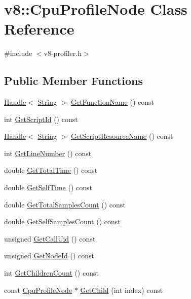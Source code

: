 \hypertarget{classv8_1_1_cpu_profile_node}{}\section{v8\+:\+:Cpu\+Profile\+Node Class Reference}
\label{classv8_1_1_cpu_profile_node}


{\ttfamily \#include $<$v8-\/profiler.\+h$>$}

\subsection*{Public Member Functions}
\begin{DoxyCompactItemize}
\item 
\hyperlink{classv8_1_1_handle}{Handle}$<$ \hyperlink{classv8_1_1_string}{String} $>$ \hyperlink{classv8_1_1_cpu_profile_node_affbc7842b66986012285602ab65aa5f8}{Get\+Function\+Name} () const 
\item 
int \hyperlink{classv8_1_1_cpu_profile_node_acf6f384df08ec40ff306d3e229f77258}{Get\+Script\+Id} () const 
\item 
\hyperlink{classv8_1_1_handle}{Handle}$<$ \hyperlink{classv8_1_1_string}{String} $>$ \hyperlink{classv8_1_1_cpu_profile_node_a140dd536e7096701a36be0083c18c268}{Get\+Script\+Resource\+Name} () const 
\item 
int \hyperlink{classv8_1_1_cpu_profile_node_a45ea035661c7152e4f3eb47f73787a75}{Get\+Line\+Number} () const 
\item 
double \hyperlink{classv8_1_1_cpu_profile_node_a49f16893b9f9c94c58ea845fb039330a}{Get\+Total\+Time} () const 
\item 
double \hyperlink{classv8_1_1_cpu_profile_node_aa2e4d36f22f49726715ed36fef5a23b6}{Get\+Self\+Time} () const 
\item 
double \hyperlink{classv8_1_1_cpu_profile_node_a0e719d2013377f03583342c28fb5cb27}{Get\+Total\+Samples\+Count} () const 
\item 
double \hyperlink{classv8_1_1_cpu_profile_node_a78537aa4471d6c1ebc37993f711090db}{Get\+Self\+Samples\+Count} () const 
\item 
unsigned \hyperlink{classv8_1_1_cpu_profile_node_a245092eb223b948fc9441664d9e2701e}{Get\+Call\+Uid} () const 
\item 
unsigned \hyperlink{classv8_1_1_cpu_profile_node_ae2971c5003353a984ef72b6cddf5e298}{Get\+Node\+Id} () const 
\item 
int \hyperlink{classv8_1_1_cpu_profile_node_ac4612b91e43a2901ac20c3705288955b}{Get\+Children\+Count} () const 
\item 
const \hyperlink{classv8_1_1_cpu_profile_node}{Cpu\+Profile\+Node} $\ast$ \hyperlink{classv8_1_1_cpu_profile_node_aa397db1e0f5147155164c5ea3e854d69}{Get\+Child} (int index) const 
\end{DoxyCompactItemize}
